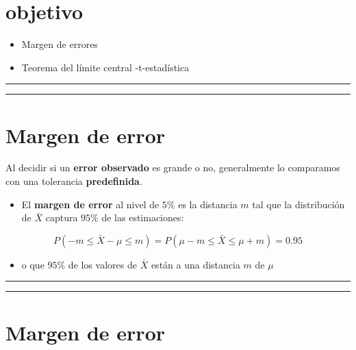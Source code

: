 \documentclass[
]{book}
\providecommand{\tightlist}{%
  \setlength{\itemsep}{0pt}\setlength{\parskip}{0pt}}
\begin{document}
\hypertarget{objetivo-10}{%
\section{objetivo}\label{objetivo-10}}

\begin{itemize}
\tightlist
\item
  Margen de errores
\item
  Teorema del límite central
  -t-estadística
\end{itemize}

\begin{center}\rule{0.5\linewidth}{0.5pt}\end{center}

\begin{center}\rule{0.5\linewidth}{0.5pt}\end{center}

\hypertarget{margen-de-error}{%
\section{Margen de error}\label{margen-de-error}}

Al decidir si un \textbf{error observado} es grande o no, generalmente lo comparamos con una tolerancia \textbf{predefinida}.

\begin{itemize}
\tightlist
\item
  El \textbf{margen de error} al nivel de \(5\%\) es la distancia \(m\) tal que la distribución de \(\bar{X}\) captura \(95\%\) de las estimaciones:
\end{itemize}

\[P(-m \leq \bar{X}-\mu \leq m)=P(\mu-m \leq \bar{X} \leq\mu + m)=0.95\]

\begin{itemize}
\tightlist
\item
  o que \(95\%\) de los valores de \(\bar{X}\) están a una distancia \(m\) de \(\mu\)
\end{itemize}

\begin{center}\rule{0.5\linewidth}{0.5pt}\end{center}

\begin{center}\rule{0.5\linewidth}{0.5pt}\end{center}

\hypertarget{margen-de-error-1}{%
\section{Margen de error}\label{margen-de-error-1}}
\end{document}
